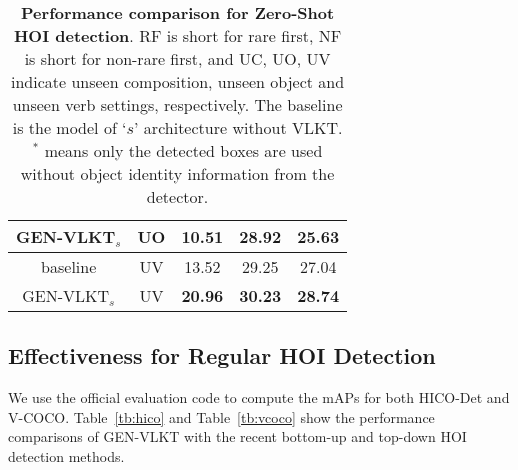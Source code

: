 \documentclass[10pt,twocolumn,letterpaper]{article}
\begin{document}
\begin{table}[t]
\begin{center}
\begin{tabular}{ccccc}
  \cellcolor{mygray-bg}GEN-VLKT$_s$			 	&\cellcolor{mygray-bg}UO			        &\cellcolor{mygray-bg}\textbf{10.51}  &\cellcolor{mygray-bg}\textbf{28.92}  &\cellcolor{mygray-bg}\textbf{25.63}\\
  \hline
  \cellcolor{mygray-bg}baseline			 	&\cellcolor{mygray-bg}UV			        &\cellcolor{mygray-bg}13.52  &\cellcolor{mygray-bg}29.25  &\cellcolor{mygray-bg}27.04\\
  \cellcolor{mygray-bg}GEN-VLKT$_s$			 	&\cellcolor{mygray-bg}UV			        &\cellcolor{mygray-bg}\textbf{20.96}  &\cellcolor{mygray-bg}\textbf{30.23}  &\cellcolor{mygray-bg}\textbf{28.74}\\
  \hline 
  \end{tabular}
  \end{center}
  \vspace{-3mm}
  \caption{\textbf{Performance comparison for Zero-Shot HOI detection}. RF is short for rare first, NF is short for non-rare first, and UC, UO, UV indicate unseen composition, unseen object and unseen verb settings, respectively. The baseline is the model of `$s$' architecture without VLKT. $^*$ means only the detected boxes are used without object identity information from the detector.}
  \vspace{-3mm}
  \label{tb:zero-shot}
\end{table}

\vspace{-1.5mm}\subsection{Effectiveness for Regular HOI Detection}\label{sec:regular}\vspace{-1.5mm}

We use the official evaluation code to compute the mAPs for both HICO-Det and V-COCO. Table~\ref{tb:hico} and Table~\ref{tb:vcoco} show the performance comparisons of GEN-VLKT with the recent bottom-up and top-down HOI detection methods. 
\end{document}
